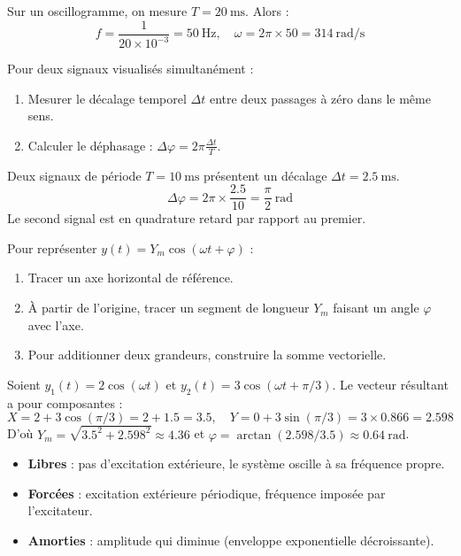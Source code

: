 \begin{exemple}
Sur un oscillogramme, on mesure $T = \SI{20}{\milli\second}$. Alors :
\[
f = \frac{1}{20\times 10^{-3}} = \SI{50}{\hertz}, \quad \omega = 2\pi \times 50 = \SI{314}{\radian\per\second}
\]
\end{exemple}

Pour deux signaux visualisés simultanément :
\begin{enumerate}
\item Mesurer le décalage temporel $\Delta t$ entre deux passages à zéro dans le même sens.
\item Calculer le déphasage : $\Delta\varphi = 2\pi \frac{\Delta t}{T}$.
\end{enumerate}

\begin{exemple}
Deux signaux de période $T = \SI{10}{\milli\second}$ présentent un décalage $\Delta t = \SI{2.5}{\milli\second}$.
\[
\Delta\varphi = 2\pi \times \frac{2.5}{10} = \frac{\pi}{2} \ \si{\radian}
\]
Le second signal est en quadrature retard par rapport au premier.
\end{exemple}

Pour représenter $y(t) = Y_m \cos(\omega t + \varphi)$ :
\begin{enumerate}
\item Tracer un axe horizontal de référence.
\item À partir de l'origine, tracer un segment de longueur $Y_m$ faisant un angle $\varphi$ avec l'axe.
\item Pour additionner deux grandeurs, construire la somme vectorielle.
\end{enumerate}

\begin{exemple}
Soient $y_1(t) = 2\cos(\omega t)$ et $y_2(t) = 3\cos(\omega t + \pi/3)$. Le vecteur résultant a pour composantes :
\[
X = 2 + 3\cos(\pi/3) = 2 + 1.5 = 3.5, \quad Y = 0 + 3\sin(\pi/3) = 3 \times 0.866 = 2.598
\]
D'où $Y_m = \sqrt{3.5^2 + 2.598^2} \approx 4.36$ et $\varphi = \arctan(2.598/3.5) \approx \SI{0.64}{\radian}$.
\end{exemple}

\begin{itemize}
\item \textbf{Libres} : pas d'excitation extérieure, le système oscille à sa fréquence propre.
\item \textbf{Forcées} : excitation extérieure périodique, fréquence imposée par l'excitateur.
\item \textbf{Amorties} : amplitude qui diminue (enveloppe exponentielle décroissante).
\end{itemize}

